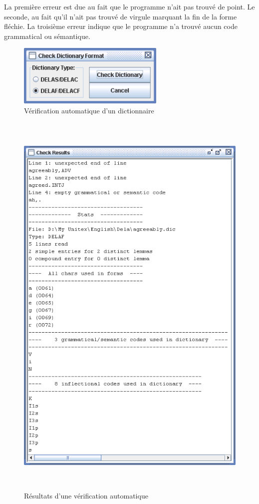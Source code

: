 \bigskip
\noindent La première erreur est due au fait que le programme n’ait pas trouvé de point.
Le seconde, au fait qu’il n’ait pas trouvé de virgule marquant la fin de la forme fléchie.
La troisième erreur indique que le programme n’a trouvé aucun code grammatical ou sémantique.




\begin{figure}[!h]
\begin{center}
\includegraphics[width=7cm]{resources/img/fig3-5.png}
\caption{Vérification automatique d’un dictionnaire\label{fig-dictionary-checking}}
\end{center}
\end{figure}

\begin{figure}[!p]
\begin{center}
\includegraphics[height=19.4cm]{resources/img/fig3-6.png}
\caption{Résultats d’une vérification automatique\label{fig-dictionary-checking-results}}
\end{center}
\end{figure}


